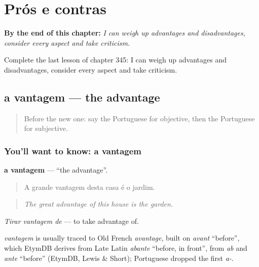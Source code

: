 
\chapter{Prós e contras}
\label{ch:pt-pros-e-contras}

\begin{chapteropening}
\textbf{By the end of this chapter:} \emph{I can weigh up advantages and disadvantages, consider every aspect and take criticism.}

Complete the last lesson of chapter 345: I can weigh up advantages and disadvantages, consider every aspect and take criticism.
\end{chapteropening}

\section[a vantagem]{a vantagem — the advantage}

\label{lesson:PT-C345-vantagem}



\begin{quote}
Before the new one: say the Portuguese for objective, then the Portuguese for subjective.
\end{quote}

\subsection*{You'll want to know: a vantagem}
\textbf{a vantagem} — \textquotedblleft{}the advantage\textquotedblright{}.

\begin{quote}
A grande vantagem desta casa é o jardim.
\end{quote}

\begin{quote}
\emph{The great advantage of this house is the garden.}
\end{quote}

\emph{Tirar vantagem de} — to take advantage of.

\begin{cousinweb}
\emph{vantagem} is usually traced to Old French \emph{avantage}, built on \emph{avant} \textquotedblleft{}before\textquotedblright{}, which EtymDB derives from Late Latin \emph{abante} \textquotedblleft{}before, in front\textquotedblright{}, from \emph{ab} and \emph{ante} \textquotedblleft{}before\textquotedblright{} (EtymDB, Lewis \& Short); Portuguese dropped the first \emph{a-}.
\end{cousinweb}

